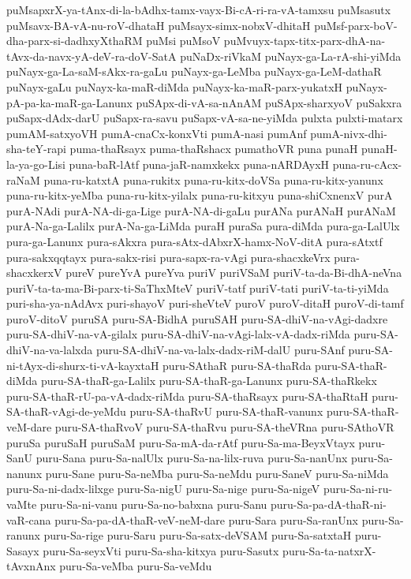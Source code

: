 {puMsapxrX-ya-tAnx-di-la-bAdhx-tamx-vayx-Bi-cA-ri-ra-vA-tamxsu
puMsasutx
puMsavx-BA-vA-nu-roV-dhataH
puMsayx-simx-nobxV-dhitaH
puMsf-parx-boV-dha-parx-si-dadhxyXthaRM
puMsi
puMsoV
puMvuyx-tapx-titx-parx-dhA-na-tAvx-da-navx-yA-deV-ra-doV-SatA
puNaDx-riVkaM
puNayx-ga-La-rA-shi-yiMda
puNayx-ga-La-saM-sAkx-ra-gaLu
puNayx-ga-LeMba
puNayx-ga-LeM-dathaR
puNayx-gaLu
puNayx-ka-maR-diMda
puNayx-ka-maR-parx-yukatxH
puNayx-pA-pa-ka-maR-ga-Lanunx
puSApx-di-vA-sa-nAnAM
puSApx-sharxyoV
puSakxra
puSapx-dAdx-darU
puSapx-ra-savu
puSapx-vA-sa-ne-yiMda
pulxta
pulxti-matarx
pumAM-satxyoVH
pumA-cnaCx-konxVti
pumA-nasi
pumAnf
pumA-nivx-dhi-sha-teY-rapi
puma-thaRsayx
puma-thaRshacx
pumathoVR
puna
punaH
punaH-la-ya-go-Lisi
puna-baR-lAtf
puna-jaR-namxkekx
puna-nARDAyxH
puna-ru-cAcx-raNaM
puna-ru-katxtA
puna-rukitx
puna-ru-kitx-doVSa
puna-ru-kitx-yanunx
puna-ru-kitx-yeMba
puna-ru-kitx-yilalx
puna-ru-kitxyu
puna-shiCxnenxV
purA
purA-NAdi
purA-NA-di-ga-Lige
purA-NA-di-gaLu
purANa
purANaH
purANaM
purA-Na-ga-Lalilx
purA-Na-ga-LiMda
puraH
puraSa
pura-diMda
pura-ga-LalUlx
pura-ga-Lanunx
pura-sAkxra
pura-sAtx-dAbxrX-hamx-NoV-ditA
pura-sAtxtf
pura-sakxqqtayx
pura-sakx-risi
pura-sapx-ra-vAgi
pura-shacxkeVrx
pura-shacxkerxV
pureV
pureYvA
pureYva
puriV
puriVSaM
puriV-ta-da-Bi-dhA-neVna
puriV-ta-ta-ma-Bi-parx-ti-SaThxMteV
puriV-tatf
puriV-tati
puriV-ta-ti-yiMda
puri-sha-ya-nAdAvx
puri-shayoV
puri-sheVteV
puroV
puroV-ditaH
puroV-di-tamf
puroV-ditoV
puruSA
puru-SA-BidhA
puruSAH
puru-SA-dhiV-na-vAgi-dadxre
puru-SA-dhiV-na-vA-gilalx
puru-SA-dhiV-na-vAgi-lalx-vA-dadx-riMda
puru-SA-dhiV-na-va-lalxda
puru-SA-dhiV-na-va-lalx-dadx-riM-dalU
puru-SAnf
puru-SA-ni-tAyx-di-shurx-ti-vA-kayxtaH
puru-SAthaR
puru-SA-thaRda
puru-SA-thaR-diMda
puru-SA-thaR-ga-Lalilx
puru-SA-thaR-ga-Lanunx
puru-SA-thaRkekx
puru-SA-thaR-rU-pa-vA-dadx-riMda
puru-SA-thaRsayx
puru-SA-thaRtaH
puru-SA-thaR-vAgi-de-yeMdu
puru-SA-thaRvU
puru-SA-thaR-vanunx
puru-SA-thaR-veM-dare
puru-SA-thaRvoV
puru-SA-thaRvu
puru-SA-theVRna
puru-SAthoVR
puruSa
puruSaH
puruSaM
puru-Sa-mA-da-rAtf
puru-Sa-ma-BeyxVtayx
puru-SanU
puru-Sana
puru-Sa-nalUlx
puru-Sa-na-lilx-ruva
puru-Sa-nanUnx
puru-Sa-nanunx
puru-Sane
puru-Sa-neMba
puru-Sa-neMdu
puru-SaneV
puru-Sa-niMda
puru-Sa-ni-dadx-lilxge
puru-Sa-nigU
puru-Sa-nige
puru-Sa-nigeV
puru-Sa-ni-ru-vaMte
puru-Sa-ni-vanu
puru-Sa-no-babxna
puru-Sanu
puru-Sa-pa-dA-thaR-ni-vaR-cana
puru-Sa-pa-dA-thaR-veV-neM-dare
puru-Sara
puru-Sa-ranUnx
puru-Sa-ranunx
puru-Sa-rige
puru-Saru
puru-Sa-satx-deVSAM
puru-Sa-satxtaH
puru-Sasayx
puru-Sa-seyxVti
puru-Sa-sha-kitxya
puru-Sasutx
puru-Sa-ta-natxrX-tAvxnAnx
puru-Sa-veMba
puru-Sa-veMdu
}
